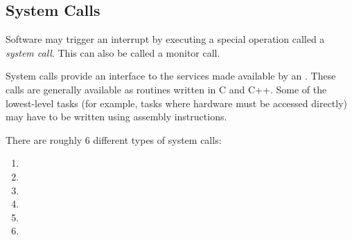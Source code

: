 \subsection{System Calls}\label{subsec:System_Calls}
\begin{definition}\label{def:System_Call}
  Software may trigger an interrupt by executing a special operation called a \emph{system call}.
  This can also be called a monitor call.

  System calls provide an interface to the services made available by an .
  These calls are generally available as routines written in C and C++.
  Some of the lowest-level tasks (for example, tasks where hardware must be accessed directly) may have to be written using assembly instructions.

  There are roughly 6 different types of system calls:
  \begin{enumerate}[noitemsep]
  \item {}
  \item {}
  \item {}
  \item {}
  \item {}
  \item {}
  \end{enumerate}
\end{definition}

